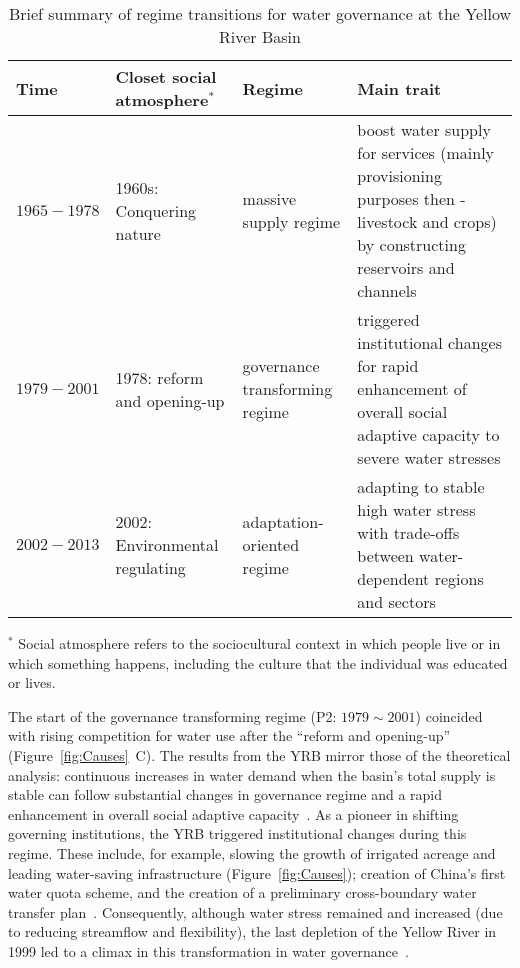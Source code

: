 \documentclass[draft]{../agujournal2019}
\begin{document}
\begin{table}[htbp]
    \centering
    \caption{Brief summary of regime transitions for water governance at the Yellow River Basin}
      \begin{tabularx}{\textwidth}{p{} p{} p{} p{}}
      \toprule
      Time  & Closet social atmosphere$^*$ & Regime & Main trait \\
      \midrule
      $1965-1978$ & 1960s: Conquering nature & massive supply regime & boost water supply for services (mainly provisioning purposes then -livestock and crops) by constructing reservoirs and channels \\
      $1979-2001$ & 1978: reform and opening-up & governance transforming regime & triggered institutional changes for rapid enhancement of overall social adaptive capacity to severe water stresses \\
      $2002-2013$ & 2002: Environmental regulating & adaptation-oriented regime & adapting to stable high water stress with trade-offs between water-dependent regions and sectors \\
      \bottomrule
      \end{tabularx}\label{tab:regimes}

      \footnotesize
      $^*$ Social atmosphere refers to the sociocultural context in which people live or in which something happens, including the culture that the individual was educated or lives.
  \end{table}
The start of the governance transforming regime (P2: $1979 \sim 2001$) coincided with rising competition for water use after the ``reform and opening-up'' (Figure~\ref{fig:Causes}~C).
The results from the YRB mirror those of the theoretical analysis: continuous increases in water demand when the basin's total supply is stable can follow substantial changes in governance regime and a rapid enhancement in overall social adaptive capacity~\cite{loch2020}.
As a pioneer in shifting governing institutions, the YRB triggered institutional changes during this regime. These include, for example, slowing the growth of irrigated acreage and leading water-saving infrastructure (Figure~\ref{fig:Causes}); creation of China's first water quota scheme, and the creation of a preliminary cross-boundary water transfer plan~\cite{wang2019e,long2020,nickum2021}.
Consequently, although water stress remained and increased (due to reducing streamflow and flexibility), the last depletion of the Yellow River in 1999 led to a climax in this transformation in water governance~\cite{wang2019e}.
\end{document}
